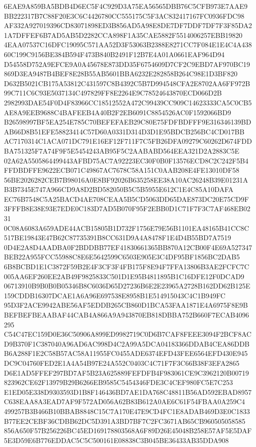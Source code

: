 \documentclass[UTF8,fontset=fandol,zihao=-4,a4paper]{ctexart}
\begin{document}
{{6EAE9A859BA5BDB4D6EC5F4C929D3A75EA56565DBB76C5CFB973E7AAE9BB222317B7C88F20E3C6C4426780CC555175C5F3AC832417167FC0936FDC98
AF332A927019396CD83071898ED3B856AD5A98E8DE7DF7DDF7DF7F3F85DA21A7DFFEF6B7AD5AB5D2282CCA898F1A35CAE5882F5514006257EBB19820
4EAA07537C16DFC19095C571AA52D3F53063B2388E8271CC7F084E1E4C4A43860C199C9156BE384B594F473B840B2491F12B7E4A01A0661EAF964D94
D54558D752A9EFCE9A0A45678E873DD35F6754609D7CF2C9EBD7AF970BC19869D3EA9487B4BEF8E28B55AB5601BBA6232E282858B264C98E1D3BF820
D632B5021CB175A53812C431597C8B4392C5B7D994548CFA2E8702AA6FF972B99C711C6C93E5037134C497829FF8E2264E9C78524643870ECD066D2B
2982993DAE54F0D4F83966CC18512552A472C99439CC909C14623333CA5C0CB5AE8A9EEB9688C4BAFEEB4A40B2F2EB6091C8854526AC0F1592066BD9
B26598997BF5EA254E785C70BEFEFAEB29C80E75FDFBDFFF9E316346139BDAB66D8B51EFE58823414C57D60A0331D314D3D1E95BDCB256BC4CD017BB
AC7170314C1ACA071DC791E16EF12F711F7C5FB26DFA09279C60262D674FDDBA751325F7A74F9F5E5454243AB95F5C2AABABD564EEA321D2A2883C5E
02A62A5505864499443AFBD75AC7A92223EC30F0B0F13576ECD8C2C242F5B4FFDBDFFE9622ECB071C49867AC7678C58A151C0AAB208E4FE13010DF58
56BE2026282CEB7B98016A0E8BF92026B635258EE38A10AC26248B39E01231AB3B7345E747A966CD9A8D2BD582050B5C5B5955E612C1E4C85A10DAFA
EC76B7548C5A25BACD4AE708CEAA5B5CD5063DD65DAE873DC20E75CD9F3FFFB8E38E93E7EDE0C183D7AD5B070F95F2EBB0D1C71F7F3C7AF468EB0231
0C08A6083A659ADE44ACB15805B1D732F1756E79E56B1101EA48165B41CC8C517BE19843E47B62C87735391B8CC631D9A4A8478F1E4D4B55BD7A7519
0D4E2A8D4AADBA0F2BDDBB77EF41830661365BB870A12CB00F4E69A527347BEB22A955FCC55988C8E6E5642599C6503E905E3C4DF95BF1856BC2DAB5
6B8BCBD1E1C3872F59B2E4F3CF3F4FB175F8E94F7FFA13806B3AE2FCFC7C005AA6EF260EE2AB49F9825833C501D1E95B4811895B1C16DFE12F0DCAD9
06713910B9B0B0B05346B8C6036D65D27236B6E2E23965A2728B162DD62B125E159CDDB16307DCAE1A6A96E697538E8958B1E514915043C4C1B949FC
95D3F2ACE9942ABE56AF5EDDB265CB860D1BCA53FAA1871E4A6975F8E9BBEFBEFBEAABAF44CAB4A866A9A943870EB818DBBA752B660F7ECAB4096295
C54C47EC159D0E36C50906A899ED9982719C0D6B7CAF8FEEE3094F2BCF8ACD9B370F1C387040A96AD6AC998D4C2A99A5DCA04183366DDAB4CEA86DDB
B6A288F1E2C58B57AC58A11955FC0455ADE6374EFD43FEE6564EFD430E945DC9C04760FED2E1A4A54B97E24A552C0403C4C71F7F3C66B38F3EFA2865
D6E1AD5FFEF297BD7AF5B23A625889FEFDFB4F983061CE9C3962120B00719823962CE62F13979B29B6266EB9585C5454346FDE3C4CEF980FC5E7C253
E1ED05E338D9303593D1B8F146436BD7AE1DA768C48811B56AD592EBAD8957C638EAA8A3EAD7AF9F572AD056A62B83B612A0AE6C61F54FBAA0A259C4
499257B3B466B10BBAB8848C15C7A170E47E9CD4FC1E8ADAB469D3E0C1833B77EE2CEBF36CDBB62DC5D391A3BD7BF7C2FC3671AB65CB960505058585
856A650F57B256226BC45ED169178803568A6F89D26E45048B258E57AF5E5DAF5E3D59E6B776EDDAC5C5C500161E08838C3B045BE36433AB35DDA908
}}
\end{document}
